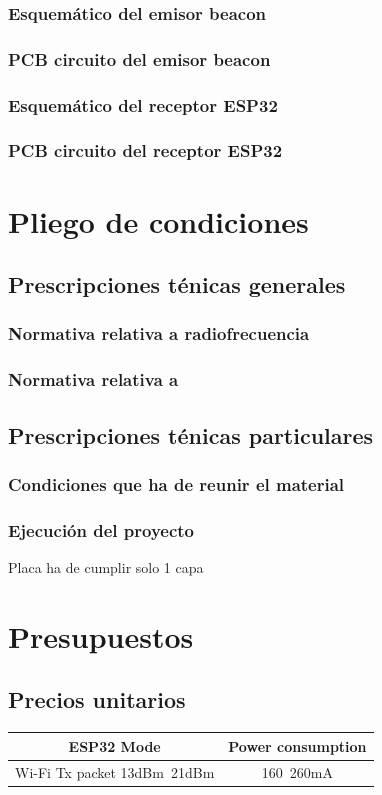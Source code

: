 \documentclass[a4paper ,12pt, onecolumn]{article}
\begin{document}
        \subsubsection{Esquemático del emisor beacon}
        \subsubsection{PCB circuito del emisor beacon}
        \subsubsection{Esquemático del receptor ESP32}
        \subsubsection{PCB circuito del receptor ESP32}
\section{Pliego de condiciones}
    \subsection{Prescripciones ténicas generales}
        \subsubsection{Normativa relativa a radiofrecuencia}
        \subsubsection{Normativa relativa a }
    \subsection{Prescripciones ténicas particulares}
        \subsubsection{Condiciones que ha de reunir el material}
        \subsubsection{Ejecución del proyecto}
        Placa ha de cumplir solo 1 capa
\section{Presupuestos}
    \subsection{Precios unitarios}
        \begin{center}
            \begin{tabular}{||c | c ||} 
            \hline
            ESP32 Mode & Power consumption  \\ [0.5ex] 
            \hline\hline
            Wi-Fi Tx packet 13dBm~21dBm & 160~260mA  \\ 
            \hline
            \end{tabular}
        \end{center}
\end{document}
